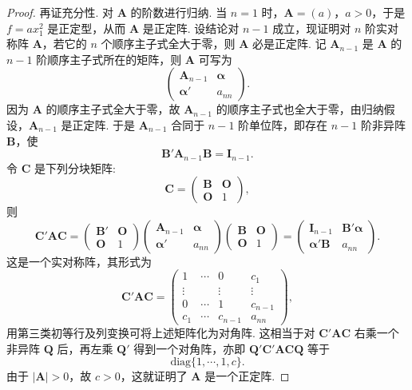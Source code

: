 \documentclass[../../main.tex]{subfiles}%
\begin{document}
\begin{proof}
再证充分性. 对 $\boldsymbol{A}$ 的阶数进行归纳. 当 $n = 1$ 时，$\boldsymbol{A}=(a)$，$a>0$，于是 $f = ax_1^2$ 是正定型，从而 $\boldsymbol{A}$ 是正定阵. 设结论对 $n - 1$ 成立，现证明对 $n$ 阶实对称阵 $\boldsymbol{A}$，若它的 $n$ 个顺序主子式全大于零，则 $\boldsymbol{A}$ 必是正定阵. 记 $\boldsymbol{A}_{n - 1}$ 是 $\boldsymbol{A}$ 的 $n - 1$ 阶顺序主子式所在的矩阵，则 $\boldsymbol{A}$ 可写为
\[
\begin{pmatrix}
\boldsymbol{A}_{n - 1} & \boldsymbol{\alpha}\\
\boldsymbol{\alpha}' & a_{nn}
\end{pmatrix}.
\]
因为 $\boldsymbol{A}$ 的顺序主子式全大于零，故 $\boldsymbol{A}_{n - 1}$ 的顺序主子式也全大于零，由归纳假设，$\boldsymbol{A}_{n - 1}$ 是正定阵. 于是 $\boldsymbol{A}_{n - 1}$ 合同于 $n - 1$ 阶单位阵，即存在 $n - 1$ 阶非异阵 $\boldsymbol{B}$，使
\[
\boldsymbol{B}'\boldsymbol{A}_{n - 1}\boldsymbol{B}=\boldsymbol{I}_{n - 1}.
\]
令 $\boldsymbol{C}$ 是下列分块矩阵:
\[
\boldsymbol{C}=\begin{pmatrix}
\boldsymbol{B} & \boldsymbol{O}\\
\boldsymbol{O} & 1
\end{pmatrix},
\]
则
\[
\boldsymbol{C}'\boldsymbol{A}\boldsymbol{C}=\begin{pmatrix}
\boldsymbol{B}' & \boldsymbol{O}\\
\boldsymbol{O} & 1
\end{pmatrix}
\begin{pmatrix}
\boldsymbol{A}_{n - 1} & \boldsymbol{\alpha}\\
\boldsymbol{\alpha}' & a_{nn}
\end{pmatrix}
\begin{pmatrix}
\boldsymbol{B} & \boldsymbol{O}\\
\boldsymbol{O} & 1
\end{pmatrix}=
\begin{pmatrix}
\boldsymbol{I}_{n - 1} & \boldsymbol{B}'\boldsymbol{\alpha}\\
\boldsymbol{\alpha}'\boldsymbol{B} & a_{nn}
\end{pmatrix}.
\]
这是一个实对称阵，其形式为
\[
\boldsymbol{C}'\boldsymbol{A}\boldsymbol{C}=\begin{pmatrix}
1 & \cdots & 0 & c_1\\
\vdots & & \vdots & \vdots\\
0 & \cdots & 1 & c_{n - 1}\\
c_1 & \cdots & c_{n - 1} & a_{nn}
\end{pmatrix},
\]
用第三类初等行及列变换可将上述矩阵化为对角阵. 这相当于对 $\boldsymbol{C}'\boldsymbol{A}\boldsymbol{C}$ 右乘一个非异阵 $\boldsymbol{Q}$ 后，再左乘 $\boldsymbol{Q}'$ 得到一个对角阵，亦即 $\boldsymbol{Q}'\boldsymbol{C}'\boldsymbol{A}\boldsymbol{C}\boldsymbol{Q}$ 等于
\[
\mathrm{diag}\{1,\cdots,1,c\}.
\]
由于 $|\boldsymbol{A}|>0$，故 $c>0$，这就证明了 $\boldsymbol{A}$ 是一个正定阵. 

\end{proof}
\end{document}
